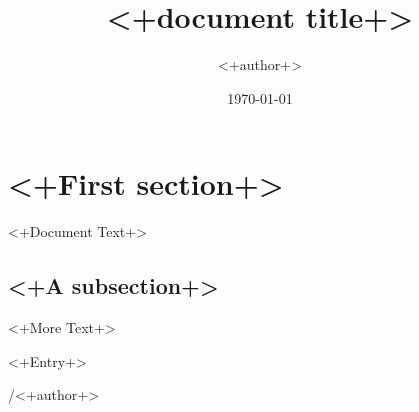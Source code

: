 \documentclass[11<++>pt,notitlepage]{article}
\begin{document}
\title{<+document title+>}
\author{<+author+>}
\date{\today<++>}

\maketitle

\thispagestyle{empty}     %


\section{<+First section+>}

<+Document Text+>


\subsection{<+A subsection+>}

<+More Text+>


%
%

\begin{thebibliography}{99}
 <+Entry+>
\end{thebibliography}


\vfill\hfill\LaTeXe/<+author+>
\end{document}
